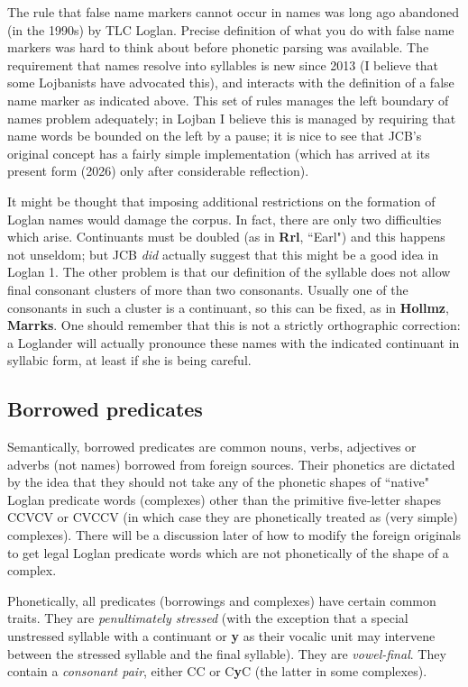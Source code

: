 \documentclass[12pt]{book}
\begin{document}
The rule that false name markers cannot occur in names was long ago abandoned (in the 1990s) by TLC Loglan.  Precise definition of what you do with false name markers was hard to think about before phonetic parsing was available.  The requirement that names resolve into syllables is new since 2013 (I believe that some Lojbanists have advocated this), and interacts with the definition of a false name marker as indicated above.    This set of rules manages the left boundary of names problem adequately;  in Lojban I believe this is managed by requiring that name words be bounded on the left by a pause;  it is nice to see that JCB's original concept
has a fairly simple implementation (which has arrived at its present form (2026) only after considerable reflection).

It might be thought that imposing additional restrictions on the formation of Loglan names would damage the corpus.  In fact, there are only two difficulties which arise.  Continuants must be doubled (as in {\bf Rrl}, ``Earl") and this happens not unseldom;  but JCB {\em did\/} actually suggest that this might be a good idea in Loglan 1.  The other problem is that our definition of the syllable does not allow final consonant clusters of more than two consonants.  Usually one of the consonants in such a cluster is a continuant, so this can be fixed, as in {\bf Hollmz}, {\bf Marrks}.  One should remember that this is not a strictly orthographic correction:  a Loglander will actually pronounce these names with the indicated continuant in syllabic form, at least if she is being careful.

\subsection{Borrowed predicates}

Semantically, borrowed predicates are common nouns, verbs, adjectives or adverbs (not names) borrowed from foreign sources.  Their phonetics are dictated by the idea that they should not take any of the phonetic shapes of ``native" Loglan predicate words (complexes) other than the primitive five-letter shapes
CCVCV or CVCCV (in which case they are phonetically treated as (very simple) complexes).  There will be a discussion later of how to modify
the foreign originals to get legal Loglan predicate words which are not phonetically of the shape of a complex.

Phonetically, all predicates (borrowings and complexes) have certain common traits.  They are {\em penultimately stressed\/} (with the exception that a special unstressed syllable with a continuant or {\bf y} as their vocalic unit may intervene between the stressed syllable and the final syllable).  They are {\em vowel-final\/}.  They contain a {\em consonant pair\/}, either CC or C{\bf y}C (the latter in some complexes).
\end{document}
